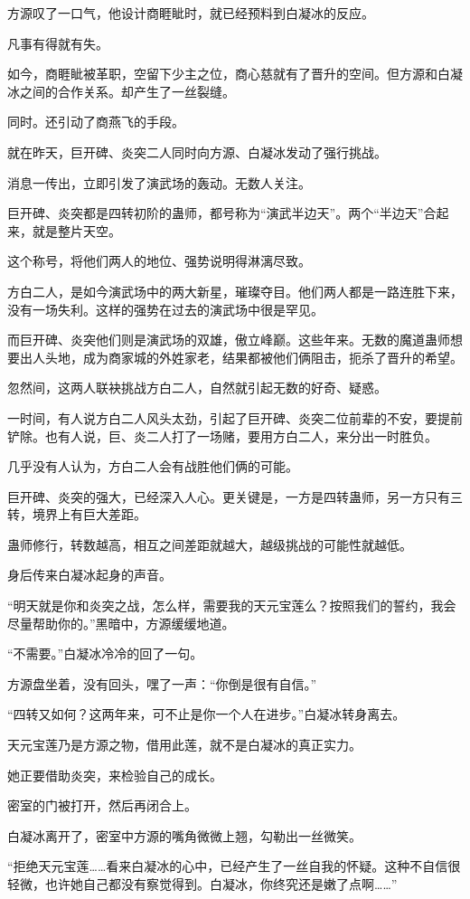 \begin{this_body}
方源叹了一口气，他设计商睚眦时，就已经预料到白凝冰的反应。

凡事有得就有失。

如今，商睚眦被革职，空留下少主之位，商心慈就有了晋升的空间。但方源和白凝冰之间的合作关系。却产生了一丝裂缝。

同时。还引动了商燕飞的手段。

就在昨天，巨开碑、炎突二人同时向方源、白凝冰发动了强行挑战。

消息一传出，立即引发了演武场的轰动。无数人关注。

巨开碑、炎突都是四转初阶的蛊师，都号称为“演武半边天”。两个“半边天”合起来，就是整片天空。

这个称号，将他们两人的地位、强势说明得淋漓尽致。

方白二人，是如今演武场中的两大新星，璀璨夺目。他们两人都是一路连胜下来，没有一场失利。这样的强势在过去的演武场中很是罕见。

而巨开碑、炎突他们则是演武场的双雄，傲立峰巅。这些年来。无数的魔道蛊师想要出人头地，成为商家城的外姓家老，结果都被他们俩阻击，扼杀了晋升的希望。

忽然间，这两人联袂挑战方白二人，自然就引起无数的好奇、疑惑。

一时间，有人说方白二人风头太劲，引起了巨开碑、炎突二位前辈的不安，要提前铲除。也有人说，巨、炎二人打了一场赌，要用方白二人，来分出一时胜负。

几乎没有人认为，方白二人会有战胜他们俩的可能。

巨开碑、炎突的强大，已经深入人心。更关键是，一方是四转蛊师，另一方只有三转，境界上有巨大差距。

蛊师修行，转数越高，相互之间差距就越大，越级挑战的可能性就越低。

身后传来白凝冰起身的声音。

“明天就是你和炎突之战，怎么样，需要我的天元宝莲么？按照我们的誓约，我会尽量帮助你的。”黑暗中，方源缓缓地道。

“不需要。”白凝冰冷冷的回了一句。

方源盘坐着，没有回头，嘿了一声：“你倒是很有自信。”

“四转又如何？这两年来，可不止是你一个人在进步。”白凝冰转身离去。

天元宝莲乃是方源之物，借用此莲，就不是白凝冰的真正实力。

她正要借助炎突，来检验自己的成长。

密室的门被打开，然后再闭合上。

白凝冰离开了，密室中方源的嘴角微微上翘，勾勒出一丝微笑。

“拒绝天元宝莲……看来白凝冰的心中，已经产生了一丝自我的怀疑。这种不自信很轻微，也许她自己都没有察觉得到。白凝冰，你终究还是嫩了点啊……”


\end{this_body}
